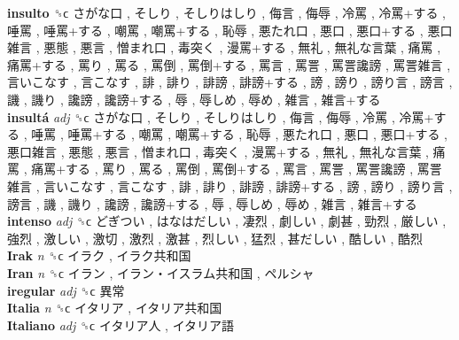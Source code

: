\textbf{insulto} ␝ϲ   さがな口 ,  そしり ,  そしりはしり ,  侮言 ,  侮辱 ,  冷罵 ,  冷罵+する ,  唾罵 ,  唾罵+する ,  嘲罵 ,  嘲罵+する ,  恥辱 ,  悪たれ口 ,  悪口 ,  悪口+する ,  悪口雑言 ,  悪態 ,  悪言 ,  憎まれ口 ,  毒突く ,  漫罵+する ,  無礼 ,  無礼な言葉 ,  痛罵 ,  痛罵+する ,  罵り ,  罵る ,  罵倒 ,  罵倒+する ,  罵言 ,  罵詈 ,  罵詈讒謗 ,  罵詈雑言 ,  言いこなす ,  言こなす ,  誹 ,  誹り ,  誹謗 ,  誹謗+する ,  謗 ,  謗り ,  謗り言 ,  謗言 ,  譏 ,  譏り ,  讒謗 ,  讒謗+する ,  辱 ,  辱しめ ,  辱め ,  雑言 ,  雑言+する   \\
\textbf{insultá} \emph{adj}  ␝ϲ   さがな口 ,  そしり ,  そしりはしり ,  侮言 ,  侮辱 ,  冷罵 ,  冷罵+する ,  唾罵 ,  唾罵+する ,  嘲罵 ,  嘲罵+する ,  恥辱 ,  悪たれ口 ,  悪口 ,  悪口+する ,  悪口雑言 ,  悪態 ,  悪言 ,  憎まれ口 ,  毒突く ,  漫罵+する ,  無礼 ,  無礼な言葉 ,  痛罵 ,  痛罵+する ,  罵り ,  罵る ,  罵倒 ,  罵倒+する ,  罵言 ,  罵詈 ,  罵詈讒謗 ,  罵詈雑言 ,  言いこなす ,  言こなす ,  誹 ,  誹り ,  誹謗 ,  誹謗+する ,  謗 ,  謗り ,  謗り言 ,  謗言 ,  譏 ,  譏り ,  讒謗 ,  讒謗+する ,  辱 ,  辱しめ ,  辱め ,  雑言 ,  雑言+する   \\
\textbf{intenso} \emph{adj}  ␝ϲ   どぎつい ,  はなはだしい ,  凄烈 ,  劇しい ,  劇甚 ,  勁烈 ,  厳しい ,  強烈 ,  激しい ,  激切 ,  激烈 ,  激甚 ,  烈しい ,  猛烈 ,  甚だしい ,  酷しい ,  酷烈   \\
\textbf{Irak} \emph{n}  ␝ϲ   イラク ,  イラク共和国   \\
\textbf{Iran} \emph{n}  ␝ϲ   イラン ,  イラン・イスラム共和国 ,  ペルシャ   \\
\textbf{iregular} \emph{adj}  ␝ϲ   異常   \\
\textbf{Italia} \emph{n}  ␝ϲ   イタリア ,  イタリア共和国   \\
\textbf{Italiano} \emph{adj}  ␝ϲ   イタリア人 ,  イタリア語   \\
